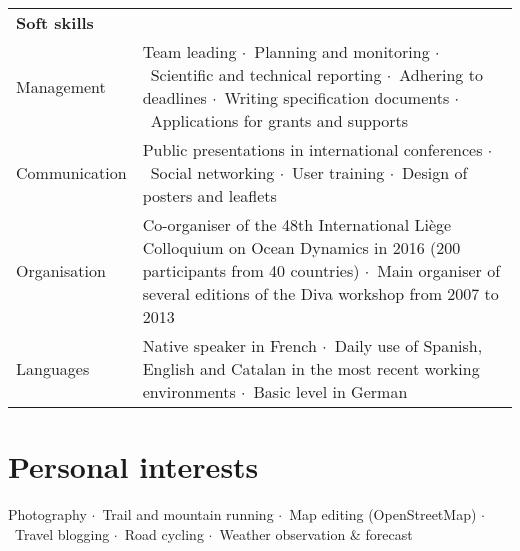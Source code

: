 \documentclass[10pt,a4paper,svgnames]{article}
\newcommand{\sepa}{$\cdot$~}
\begin{document}
\begin{tabular}{p{}| p{}}
\textbf{Soft skills} & \\

Management & Team leading \sepa Planning and monitoring \sepa Scientific and technical reporting \sepa Adhering to deadlines \sepa Writing specification documents \sepa Applications for grants and supports\\

Communication & Public presentations in international conferences \sepa Social networking \sepa User training \sepa Design of posters and leaflets\\

Organisation & Co-organiser of the 48th International Li\`{e}ge Colloquium on Ocean Dynamics in 2016 (200 participants from 40 countries) \sepa Main organiser of several editions of the Diva workshop from 2007 to 2013\\

Languages & Native speaker in French \sepa Daily use of Spanish, English and Catalan in the most recent working environments \sepa Basic level in German
\end{tabular}








\section*{Personal interests}

Photography \sepa Trail and mountain running \sepa Map editing (OpenStreetMap) \sepa Travel blogging \sepa Road cycling \sepa Weather observation \& forecast
\end{document}

